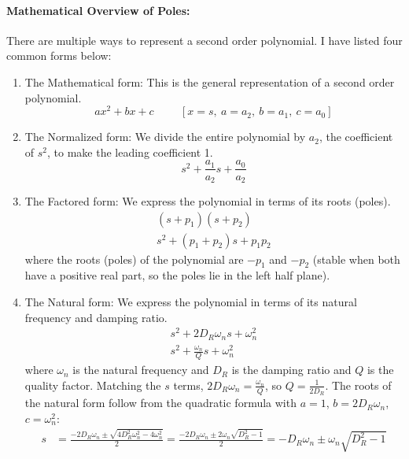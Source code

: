 \paragraph{Mathematical Overview of Poles:}
There are multiple ways to represent a second order
polynomial. I have listed four common forms below:
\begin{enumerate}
  \item The Mathematical form: This is the general representation
    of a second order polynomial.
    \begin{equation*}
      a x^2 + b x + c \hspace{1cm} [x = s,\ a = a_2,\ b = a_1,\ c = a_0]
    \end{equation*}
  \item The Normalized form: We divide the entire polynomial
    by \(a_2\), the coefficient of \( s^2 \), to make
    the leading coefficient 1.
    \begin{equation*}
      s^2 + \frac{a_1}{a_2}s + \frac{a_0}{a_2}
    \end{equation*}
  \item The Factored form: We express the polynomial
    in terms of its roots (poles).
    \begin{align*}
      (s + p_1)(s + p_2) \\
      s^2 + (p_1 + p_2)s + p_1 p_2
    \end{align*}
    where the roots (poles) of the polynomial are \( -p_1 \) and \( -p_2 \)
    (stable when both have a positive real part, so the poles lie in the
    left half plane).
  \item The Natural form: We express the polynomial
    in terms of its natural frequency and damping ratio.
    \begin{align*}
      s^2 + 2 D_R \omega_n s + \omega_n^2 \\
      s^2 + \frac{\omega_n}{Q} s + \omega_n^2
    \end{align*}
    where \( \omega_n \) is the natural frequency and \( D_R \) is the
    damping ratio and \( Q\) is the quality factor. Matching the \(s\) terms,
    \(2D_R\omega_n = \frac{\omega_n}{Q}\), so \(Q = \frac{1}{2D_R}\). The roots of the natural form
    follow from the quadratic formula with \(a = 1\), \(b = 2D_R\omega_n\), \(c = \omega_n^2\):
    \begin{align*}
      s &= \frac{-2D_R\omega_n \pm \sqrt{4D_R^2\omega_n^2 - 4\omega_n^2}}{2}
         = \frac{-2D_R\omega_n \pm 2\omega_n\sqrt{D_R^2 - 1}}{2}
         = -D_R\omega_n \pm \omega_n\sqrt{D_R^2 - 1}

\end{align*}
\end{enumerate}
